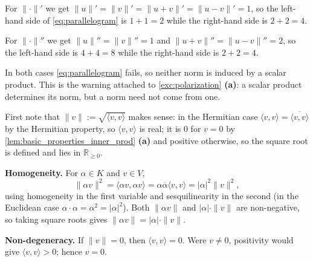 \begin{exercisesolution}
  For $\| \cdot \|'$ we get $\|u\|' = \|v\|' = \|u+v\|' = \|u-v\|' = 1$, so the left-hand side of \eqref{eq:parallelogram} is $1 + 1 = 2$ while the right-hand side is $2 + 2 = 4$.

  For $\| \cdot \|''$ we get $\|u\|'' = \|v\|'' = 1$ and $\|u+v\|'' = \|u-v\|'' = 2$, so the left-hand side is $4 + 4 = 8$ while the right-hand side is $2 + 2 = 4$.

  In both cases \eqref{eq:parallelogram} fails, so neither norm is induced by a scalar product. This is the warning attached to \cref{exc:polarization} \textbf{(a)}: a scalar product determines its norm, but a norm need not come from one.
\end{exercisesolution}

\begin{exercisesolution}
\label{sol:remaining_norm_axioms}
  First note that $\|v\| := \sqrt{\langle v, v \rangle}$ makes sense: in the Hermitian case $\langle v, v \rangle = \overline{\langle v, v \rangle}$ by the Hermitian property, so $\langle v, v \rangle$ is real; it is $0$ for $v = 0$ by \cref{lem:basic_properties_inner_prod} \textbf{(a)} and positive otherwise, so the square root is defined and lies in $\mathbb{R}_{\ge 0}$.

  \textbf{Homogeneity.} For $\alpha \in K$ and $v \in V$,
  \[ \|\alpha v\|^2 = \langle \alpha v, \alpha v \rangle = \alpha \overline{\alpha} \langle v, v \rangle = |\alpha|^2 \|v\|^2, \]
  using homogeneity in the first variable and sesquilinearity in the second (in the Euclidean case $\alpha \cdot \alpha = \alpha^2 = |\alpha|^2$). Both $\|\alpha v\|$ and $|\alpha| \cdot \|v\|$ are non-negative, so taking square roots gives $\|\alpha v\| = |\alpha| \cdot \|v\|$.

  \textbf{Non-degeneracy.} If $\|v\| = 0$, then $\langle v, v \rangle = 0$. Were $v \ne 0$, positivity would give $\langle v, v \rangle > 0$; hence $v = 0$.
\end{exercisesolution}

